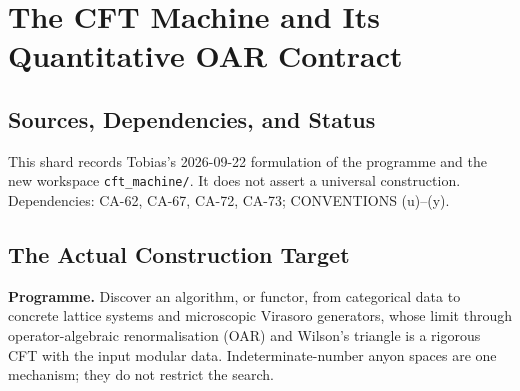 
\section{The CFT Machine and Its Quantitative OAR Contract}
\label{sec:cft-machine-oar-contract}

\subsection{Sources, Dependencies, and Status}

This shard records Tobias's 2026-09-22 formulation of the programme and
the new workspace \texttt{cft\_machine/}. It does not assert a universal
construction. Dependencies: CA-62, CA-67, CA-72, CA-73;
CONVENTIONS (u)--(y).


\subsection{The Actual Construction Target}

\textbf{Programme.} Discover an algorithm, or functor, from categorical
data to concrete lattice systems and microscopic Virasoro generators,
whose limit through operator-algebraic renormalisation (OAR) and Wilson's
triangle is a rigorous CFT with the input modular data. Indeterminate-number
anyon spaces are one mechanism; they do not restrict the search.

